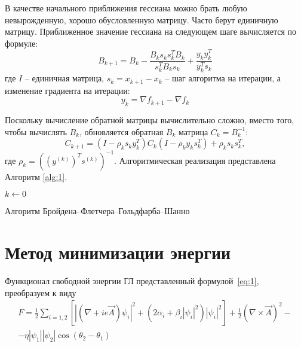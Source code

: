В качестве начального приближения гессиана можно брать любую невырожденную, 
хорошо обусловленную матрицу. Часто берут единичную матрицу. Приближенное 
значение гессиана на следующем шаге вычисляется по формуле:
\[ 
    B_{k + 1} = B_k - \frac{B_k s_k s_k^T B_k}{s_k^T B_k s_k} + 
        \frac{y_k y_k^T}{y_k^T s_k} 
\]
где \( I \) -- единичная матрица, \( s_k = x_{k + 1} - x_k \) -- шаг алгоритма 
на итерации, а изменение градиента на итерации:
\begin{equation} 
    y_k = \nabla f_{k + 1} - \nabla f_{k} 
    \label{eq:y_k}
\end{equation}

Поскольку вычисление обратной матрицы вычислительно сложно, вместо того, 
чтобы вычислять \( B_k \), обновляется обратная \( B_k \) матрица 
\( C_k = B_k^{-1} \):
\begin{equation}
    C_{k + 1} = (I - \rho_k s_k y_k^T)C_k(I - \rho_k y_k s_k^T) + 
        \rho_k s_k s_k^T, 
    \label{eq:c_k}
\end{equation}
где \( \rho_k = ((y^{(k)})^T s^{(k)})^{-1} \). Алгоритмическая реализация 
представлена Алгоритм \ref{alg:1}.

\clearpage

\begin{algorithm}[htb]
    \SetAlgoLined
    $k \gets 0$\;
    \caption{Алгоритм Бройдена--Флетчера--Гольдфарба--Шанно 
        \cite{skajaa2010limited}}
    \label{alg:1}
\end{algorithm}

\section{Метод минимизации энергии}

Функционал свободной энергии ГЛ представленный формулой~\eqref{eq:1}, 
преобразуем к виду
\begin{gather}
    F = \frac{1}{2}\sum\limits_{i=1,2}\left[ 
        \left|\left( \nabla + ie\vec{A}\right)\psi_i\right|^2 + 
        \left( 2\alpha_i + \beta_i |\psi_i|^2 \right)|\psi_i|^2 \right] + 
        \frac{1}{2}\left( \nabla\times\vec{A} \right)^2 - \nonumber \\
        - \eta|\psi_1||\psi_2|\cos(\theta_2-\theta_1)
    \label{eqm:1}
\end{gather}

